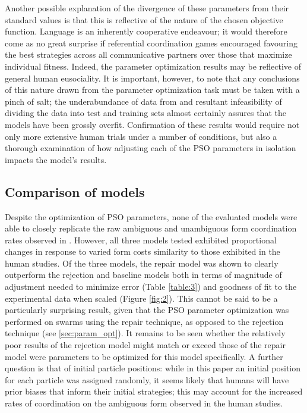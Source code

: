 \documentclass[12pt,a4paper]{article}
\begin{document}
Another possible explanation of the divergence of these parameters from their standard values is that this is reflective of the nature of the chosen objective function. Language is an inherently cooperative endeavour; it would therefore come as no great surprise if referential coordination games encouraged favouring the best strategies across all communicative partners over those that maximize individual fitness. Indeed, the parameter optimization results may be reflective of general human eusociality. It is important, however, to note that any conclusions of this nature drawn from the parameter optimization task must be taken with a pinch of salt; the underabundance of data from \citeauthor{rohde2012} and resultant infeasibility of dividing the data into test and training sets almost certainly assures that the models have been grossly overfit. Confirmation of these results would require not only more extensive human trials under a number of conditions, but also a thorough examination of how adjusting each of the PSO parameters in isolation impacts the model's results.

\subsection{Comparison of models}
Despite the optimization of PSO parameters, none of the evaluated models were able to closely replicate the raw ambiguous and unambiguous form coordination rates observed in \citeauthor{rohde2012}. However, all three models tested exhibited proportional changes in response to varied form costs similarity to those exhibited in the human studies. Of the three models, the repair model was shown to clearly outperform the rejection and baseline models both in terms of magnitude of adjustment needed to minimize error (Table \ref{table:3}) and goodness of fit to the experimental data when scaled (Figure \ref{fig:2}). This cannot be said to be a particularly surprising result, given that the PSO parameter optimization was performed on swarms using the repair technique, as opposed to the rejection technique (see \ref{sec:param_opt}). It remains to be seen whether the relatively poor results of the rejection model might match or exceed those of the repair model were parameters to be optimized for this model specifically. A further question is that of initial particle positions: while in this paper an initial position for each particle was assigned randomly, it seems likely that humans will have prior biases that inform their initial strategies; this may account for the increased rates of coordination on the ambiguous form observed in the \citeauthor{rohde2012} human studies.
\end{document}
